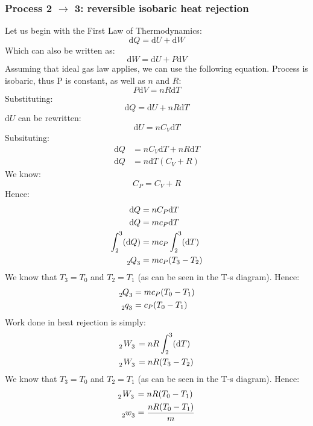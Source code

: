\documentclass[12pt]{article}
\numberwithin{equation}{section}
\begin{document}
\begin{flushleft}
\subsubsection*{Process 2 $\rightarrow$ 3: reversible isobaric heat rejection}
Let us begin with the First Law of Thermodynamics:
\begin{equation}
  \mathrm{d}Q = \mathrm{d}U + \mathrm{d}W
\end{equation}
Which can also be written as:
\begin{equation}
  \mathrm{d}W = \mathrm{d}U + P\mathrm{d}V
\end{equation}
Assuming that ideal gas law applies, we can use the following equation. Process is isobaric, thus P is constant, as well as $n$ and $R$:
\begin{equation}
  P\mathrm{d}V = nR\mathrm{d}T
\end{equation}
Substituting:
\begin{equation}
  \mathrm{d}Q = \mathrm{d}U + nR\mathrm{d}T
\end{equation}
$\mathrm{d}U$ can be rewritten:
\begin{equation}
  \mathrm{d}U = nC_V \mathrm{d}T 
\end{equation}
Subsituting:
\begin{align}
  \mathrm{d}Q &= nC_V \mathrm{d}T + nR\mathrm{d}T\\
  \mathrm{d}Q &= n\mathrm{d}T (C_V + R)
\end{align}
We know:
\begin{equation}
  C_P = C_V +R 
\end{equation}
Hence:
\begin{align}
  \mathrm{d}Q &= nC_P \mathrm{d}T\\
  \mathrm{d}Q &= mc_P \mathrm{d}T\\
  \int_2^3 (\mathrm{d}Q) &= mc_P \int_2^3 (\mathrm{d}T)\\
  \tensor[_2]{Q}{_3} &= mc_P (T_3 - T_2)
\end{align}
We know that $T_3 = T_0$ and $T_2 = T_1$ (as can be seen in the T-s diagram). Hence:
\begin{align}
  \tensor[_2]{Q}{_3} &= mc_P (T_0 - T_1)\\
  \tensor[_2]{q}{_3} &= c_P (T_0 - T_1)
\end{align}
Work done in heat rejection is simply:
\begin{align}
  \tensor[_2]{W}{_3} &= nR\int_2^3(\mathrm{d}T)\\
  \tensor[_2]{W}{_3} &= nR(T_3 - T_2)
\end{align}
We know that $T_3 = T_0$ and $T_2 = T_1$ (as can be seen in the T-s diagram). Hence:
\begin{align}
  \tensor[_2]{W}{_3} &= nR(T_0 - T_1)\\
  \tensor[_2]{w}{_3} &= \frac{nR(T_0 - T_1)}{m}
\end{align}

\end{flushleft}
\end{document}
